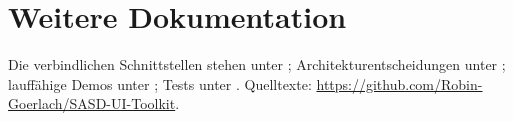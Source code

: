 \ifdefined\SASDPrintEdition\cleardoublepage\else\clearpage\fi
\chapter*{Weitere Dokumentation}
Die verbindlichen Schnittstellen stehen unter ;
Architekturentscheidungen unter ; lauffähige Demos unter
; Tests unter .
Quelltexte: \url{https://github.com/Robin-Goerlach/SASD-UI-Toolkit}.
